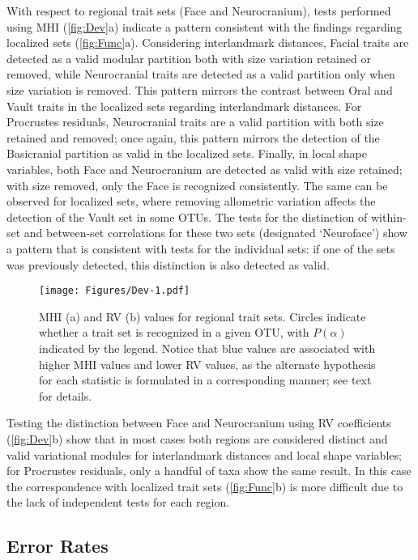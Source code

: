 \documentclass[12pt,twoside]{report}
\begin{document}
With respect to regional trait sets (Face and Neurocranium), tests
performed using MHI (\autoref{fig:Dev}a) indicate a pattern consistent
with the findings regarding localized sets (\autoref{fig:Func}a).
Considering interlandmark distances, Facial traits are detected as a
valid modular partition both with size variation retained or removed,
while Neurocranial traits are detected as a valid partition only when
size variation is removed. This pattern mirrors the contrast between
Oral and Vault traits in the localized sets regarding interlandmark
distances. For Procrustes residuals, Neurocranial traits are a valid
partition with both size retained and removed; once again, this pattern
mirrors the detection of the Basicranial partition as valid in the
localized sets. Finally, in local shape variables, both Face and
Neurocranium are detected as valid with size retained; with size
removed, only the Face is recognized consistently. The same can be
observed for localized sets, where removing allometric variation affects
the detection of the Vault set in some OTUs. The tests for the
distinction of within-set and between-set correlations for these two
sets (designated `Neuroface') show a pattern that is consistent with
tests for the individual sets: if one of the sets was previously
detected, this distinction is also detected as valid.

\begin{figure}[htbp]
\centering
\texttt{[image: Figures/Dev-1.pdf]}
\caption{MHI (a) and RV (b) values for regional trait sets. Circles
indicate whether a trait set is recognized in a given OTU, with
$P(\alpha)$ indicated by the legend. Notice that blue values are
associated with higher MHI values and lower RV values, as the alternate
hypothesis for each statistic is formulated in a corresponding manner;
see text for details. \label{fig:Dev}}
\end{figure}

Testing the distinction between Face and Neurocranium using RV
coefficients (\autoref{fig:Dev}b) show that in most cases both regions
are considered distinct and valid variational modules for interlandmark
distances and local shape variables; for Procrustes residuals, only a
handful of taxa show the same result. In this case the correspondence
with localized trait sets (\autoref{fig:Func}b) is more difficult due to
the lack of independent tests for each region.

\subsection{Error Rates}\label{error-rates}
\end{document}
